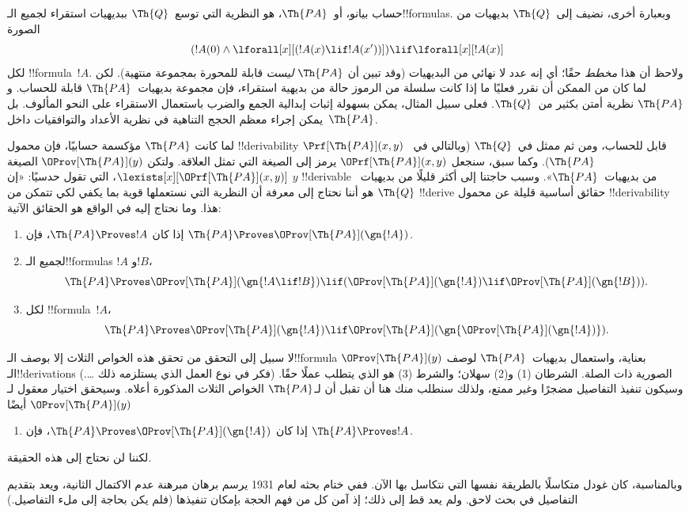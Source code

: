 \documentclass[../../../include/open-logic-section]{subfiles}
\begin{document}


حساب بيانو، أو~$\Th{PA}$، هو النظرية التي توسع~$\Th{Q}$ ببديهيات
استقراء لجميع الـ!!{formula}s. وبعبارة أخرى، نضيف إلى~$\Th{Q}$
بديهيات من الصورة
\[
(!A(0) \land \lforall[x][(!A(x) \lif !A(x'))]) \lif \lforall[x][!A(x)]
\]
لكل !!{formula}~$!A$. ولاحظ أن هذا \emph{مخطط} حقًا؛ أي إنه عدد لا
نهائي من البديهيات (وقد تبين أن $\Th{PA}$ {\em ليست} قابلة للمحورة
بمجموعة منتهية). لكن لما كان من الممكن أن نقرر فعليًا ما إذا كانت
سلسلة من الرموز حالة من بديهية استقراء، فإن مجموعة بديهيات~$\Th{PA}$
قابلة للحساب. و$\Th{PA}$ نظرية أمتن بكثير من~$\Th{Q}$. فعلى سبيل
المثال، يمكن بسهولة إثبات إبدالية الجمع والضرب باستعمال الاستقراء على
النحو المألوف. بل يمكن إجراء معظم الحجج التناهية في نظرية الأعداد
والتوافقيات داخل~$\Th{PA}$.

لما كانت $\Th{PA}$ مؤكسمة حسابيًا، فإن محمول !!{derivability}
$\Prf[\Th{PA}](x,y)$ قابل للحساب، ومن ثم ممثل في~$\Th{Q}$ (وبالتالي
في~$\Th{PA}$). وكما سبق، سنجعل $\OPrf[\Th{PA}](x,y)$ يرمز إلى الصيغة
التي تمثل العلاقة. ولتكن $\OProv[\Th{PA}](y)$ الصيغة
$\lexists[x][\OPrf[\Th{PA}](x,y)]$، التي تقول حدسيًا: «إن $y$
!!{derivable} من بديهيات~$\Th{PA}$». وسبب حاجتنا إلى أكثر قليلًا من
بديهيات~$\Th{Q}$ هو أننا نحتاج إلى معرفة أن النظرية التي نستعملها
قوية بما يكفي لكي تتمكن من !!{derive} حقائق أساسية قليلة عن محمول
!!{derivability} هذا. وما نحتاج إليه في الواقع هو الحقائق الآتية:
\begin{enumerate}
\item[P1.] إذا كان $\Th{PA}\Proves !A$، فإن
  $\Th{PA}\Proves\OProv[\Th{PA}](\gn{!A})$.
\item[P2.] لجميع الـ!!{formula}s $!A$ و$!B$،
  \[
  \Th{PA} \Proves \OProv[\Th{PA}](\gn{!A \lif !B}) \lif
  (\OProv[\Th{PA}](\gn{!A}) \lif \OProv[\Th{PA}](\gn{!B})).
  \]
\item[P3.] لكل !!{formula}~$!A$،
  \[
  \Th{PA} \Proves \OProv[\Th{PA}](\gn{!A})
  \lif \OProv[\Th{PA}](\gn{\OProv[\Th{PA}](\gn{!A})}).
  \]
\end{enumerate}
لا سبيل إلى التحقق من تحقق هذه الخواص الثلاث إلا بوصف الـ!!{formula}
$\OProv[\Th{PA}](y)$ بعناية، واستعمال بديهيات~$\Th{PA}$ لوصف
الـ!!{derivation}s الصورية ذات الصلة. الشرطان (1) و(2) سهلان؛ والشرط
(3) هو الذي يتطلب عملًا حقًا. (فكر في نوع العمل الذي يستلزمه ذلك
\dots.) وسيكون تنفيذ التفاصيل مضجرًا وغير ممتع، ولذلك سنطلب منك هنا
أن تقبل أن لـ$\Th{PA}$ الخواص الثلاث المذكورة أعلاه. وسيحقق اختيار
معقول لـ$\OProv[\Th{PA}](y)$ أيضًا
\begin{enumerate}
\item[P4.] إذا كان
  $\Th{PA}\Proves\OProv[\Th{PA}](\gn{!A})$، فإن
  $\Th{PA}\Proves !A$.
\end{enumerate}
لكننا لن نحتاج إلى هذه الحقيقة.

\begin{digress}
وبالمناسبة، كان غودل متكاسلًا بالطريقة نفسها التي نتكاسل بها الآن.
ففي ختام بحثه لعام 1931 يرسم برهان مبرهنة عدم الاكتمال الثانية، ويعد
بتقديم التفاصيل في بحث لاحق. ولم يعد قط إلى ذلك؛ إذ آمن كل من فهم
الحجة بإمكان تنفيذها (فلم يكن بحاجة إلى ملء التفاصيل.)
\end{digress}
\end{document}
